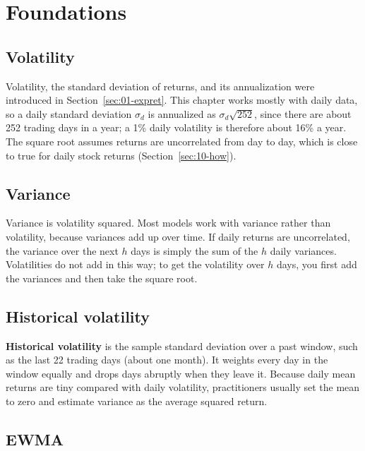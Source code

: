 \section{Foundations}
\label{sec:10-foundations}

\subsection{Volatility}

Volatility, the standard deviation of returns, and its annualization were introduced in Section~\ref{sec:01-expret}. This chapter works mostly with daily data, so a daily standard deviation $\sigma_d$ is annualized as $\sigma_d\sqrt{252}$, since there are about 252 trading days in a year; a 1\% daily volatility is therefore about 16\% a year. 
The square root assumes returns are uncorrelated from day to day, which is close to true for daily stock returns (Section~\ref{sec:10-how}). 

\subsection{Variance}

Variance is volatility squared. 
Most models work with variance rather than volatility, because variances add up over time. If daily returns are uncorrelated, the variance over the next $h$ days is simply the sum of the $h$ daily variances. Volatilities do not add in this way; to get the volatility over $h$ days, you first add the variances and then take the square root.


\subsection{Historical volatility}

\textbf{Historical volatility} is the sample standard deviation over a past window, such as the last 22 trading days (about one month). It weights every day in the window equally and drops days abruptly when they leave it. Because daily mean returns are tiny compared with daily volatility, practitioners usually set the mean to zero and estimate variance as the average squared return.

\subsection{EWMA}


